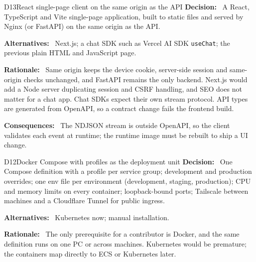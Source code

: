 \documentclass[11pt,letterpaper]{report}
\newcommand{\field}[1]{\textbf{\color{lauPurple}#1:}~}
\begin{document}
\begin{decision}{D13}{React single-page client on the same origin as the API}
\field{Decision} A React, TypeScript and Vite single-page application, built to static files and
served by Nginx (or FastAPI) on the same origin as the API.\par
\field{Alternatives} Next.js; a chat SDK such as Vercel AI SDK \texttt{useChat}; the previous plain
HTML and JavaScript page.\par
\field{Rationale} Same origin keeps the device cookie, server-side session and same-origin checks
unchanged, and FastAPI remains the only backend. Next.js would add a Node server duplicating session
and CSRF handling, and SEO does not matter for a chat app. Chat SDKs expect their own stream protocol.
API types are generated from OpenAPI, so a contract change fails the frontend build.\par
\field{Consequences} The NDJSON stream is outside OpenAPI, so the client validates each event at
runtime; the runtime image must be rebuilt to ship a UI change.
\end{decision}

\begin{decision}{D12}{Docker Compose with profiles as the deployment unit}
\field{Decision} One Compose definition with a profile per service group; development and production
overrides; one env file per environment (development, staging, production); CPU and memory limits on every container; loopback-bound ports; Tailscale between machines
and a Cloudflare Tunnel for public ingress.\par
\field{Alternatives} Kubernetes now; manual installation.\par
\field{Rationale} The only prerequisite for a contributor is Docker, and the same definition runs on
one PC or across machines. Kubernetes would be premature; the containers map directly to ECS or
Kubernetes later.
\end{decision}
\end{document}
